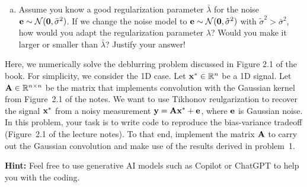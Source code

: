 \documentclass[11pt,a4paper]{article}
\begin{document}
\begin{problem}
\begin{enumerate}[(a)]
		\item Assume you know a good regularization parameter $\bar{\lambda}$ for the noise $\mathbf e \sim \mathcal{N}(\mathbf{0}, \bar{\sigma}^2)$. If we change the noise model to $\mathbf e \sim \mathcal{N}(\mathbf{0}, \tilde{\sigma}^2)$ with $\tilde{\sigma}^2 > \bar{\sigma}^2$, how would you adapt the regularization parameter $\lambda$? Would you make it larger or smaller than $\bar{\lambda}$? Justify your answer!
	\end{enumerate}	
\end{problem}


\begin{problem}
	Here, we numerically solve the deblurring problem discussed in Figure 2.1 of the book. For simplicity, we consider the 1D case. Let $\mathbf x^* \in \mathbb{R}^n$ be a 1D signal. Let $\mathbf A \in \mathbb R^{n\times n}$ be the matrix that implements convolution with the Gaussian kernel from Figure~2.1 of the notes. We want to use Tikhonov reulgarization to recover the signal $\mathbf x^*$ from a noisy measurement $\mathbf y = \mathbf A \mathbf x^* + \mathbf e$, where $\mathbf e$ is Gaussian noise. In this problem, your task is to write code to reproduce the bias-variance tradeoff (Figure~2.1 of the lecture notes). To that end, implement the matrix $\mathbf A$ to carry out the Gaussian convolution and make use of the results derived in problem~1.
	
	\textbf{Hint:} Feel free to use generative AI models such as Copilot or ChatGPT to help you with the coding.
	
\end{problem}
\end{document}
